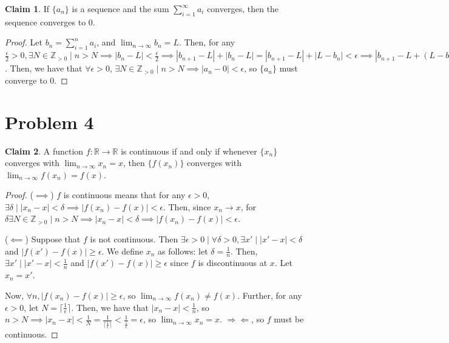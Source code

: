 \documentclass[12pt,letterpaper]{article}
\theoremstyle{definition}
\newtheorem*{claim}{Claim}
\newcommand{\contra}{\Rightarrow\!\Leftarrow}
\newcommand{\R}{\mathbb{R}}
\newcommand{\Zg}{\mathbb{Z}_{>0}}
\begin{document}
\begin{claim}
  If $\{ a_n \}$ is a sequence and the sum $\sum_{i=1}^\infty a_i$ converges,
  then the sequence converges to 0.
\end{claim}

\begin{proof}
  Let $b_n = \sum_{i=1}^n a_i$,
  and $\lim_{n\rightarrow \infty}b_n = L$. Then, for any $\frac{\epsilon}{2} > 0, \exists
  N \in \Zg \mid n > N \implies |b_n - L| < \frac{\epsilon}{2} \implies |b_{n+1} - L| +
  |b_{n} - L| = |b_{n+1} - L| + |L - b_n|< \epsilon \implies |b_{n+1} - L + (L - b_n)| = |b_{n+1} - b_n| =
  |a_{n+1} - 0| < \epsilon$. Then, we have that $\forall \epsilon > 0$, $\exists
  N \in \Zg \mid n > N \implies |a_n - 0| < \epsilon$, so $\{a_n\}$ must
  converge to 0.
\end{proof}

\section*{Problem 4}

\begin{claim}
  A function $f: \R \rightarrow \R$ is continuous if and only if whenever $\{
  x_n \}$ converges with $\lim_{n\rightarrow \infty} x_n = x$, then $\{f(x_n)\}$
  converges with $\lim_{n\rightarrow \infty} f(x_n) = f(x)$.
\end{claim}

\begin{proof}
  ($\implies$) $f$ is continuous means that for any $\epsilon > 0$, $\exists
  \delta \mid |x_n - x| < \delta \implies |f(x_n) - f(x)| < \epsilon$. Then,
  since $x_n \rightarrow x$, for $\delta \exists N \in \Zg \mid n > N \implies
  |x_n - x| < \delta \implies |f(x_n) - f(x)| < \epsilon$.

  ($\impliedby$) Suppose that $f$ is not continuous. Then $\exists \epsilon > 0
  \mid \forall \delta > 0, \exists x' \mid |x' - x| < \delta$ and $|f(x') -
  f(x)| \geq \epsilon$. We define $x_n$ as follows: let $\delta = \frac{1}{n}$.
  Then, $\exists x' \mid |x' - x| < \frac{1}{n}$ and $|f(x') - f(x)| \geq
  \epsilon$ since $f$ is discontinuous at $x$. Let $x_n = x'$.

  Now, $\forall n, |f(x_n) - f(x)| \geq \epsilon$, so $\lim_{n\rightarrow
    \infty}f(x_n) \neq f(x)$. Further, for any $\epsilon > 0$, let $N = \lceil
  \frac{1}{\epsilon} \rceil$. Then, we have that $|x_n - x| < \frac{1}{n}$, so
  $n > N \implies |x_n - x| < \frac{1}{N} = \frac{1}{\lceil
    \frac{1}{\epsilon} \rceil} < \frac{1}{\frac{1}{\epsilon}} = \epsilon$, so
  $\lim_{n\rightarrow \infty} x_n = x$. $\contra$, so $f$ must be continuous.
\end{proof}
\end{document}
